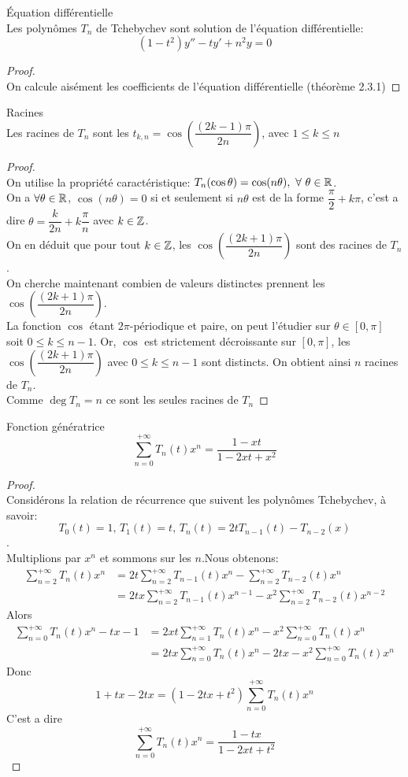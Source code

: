 \bprop
Équation différentielle
\\Les polynômes $ T_{n} $ de Tchebychev sont solution de l'équation différentielle:
$$(1-t^{2})y''-ty'+n^{2}y=0$$
\eprop
\begin{proof}
$ $\\
On calcule aisément les coefficients de l'équation différentielle (théorème 2.3.1)
\end{proof}

\bprop
Racines
\\Les racines de $T_n$ sont les $t_{k,n}=\cos \left(\dfrac{(2k-1)\pi}{2n}\right)$, avec $1\leqslant k \leqslant n$
\eprop
\begin{proof}
$ $\\On utilise la propriété caractéristique: $ T_{n}(\cos \theta)=\cos (n\theta),\ \forall \ \theta \in \R$.
\\On a $\forall \theta \in \mathbb R$, $\cos (n\theta)=0$ si et seulement si $n\theta$ est de la forme $\dfrac{\pi}{2}+k\pi$, c'est a dire $\theta = \dfrac{k}{2n}+k\dfrac{\pi}{n}$ avec $k\in \mathbb Z$.
\\On en déduit que pour tout $k\in \mathbb Z$, les $\cos \left(\dfrac{(2k+1)\pi}{2n}\right)$ sont des racines de $T_n$.
\\On cherche maintenant combien de valeurs distinctes prennent les $\cos \left(\dfrac{(2k+1)\pi}{2n}\right)$.
\\La fonction $\cos$ étant $2\pi$-périodique et paire, on peut l'étudier sur $\theta \in [0, \pi]$ soit $0\leqslant k \leqslant n-1$. Or, $\cos$ est strictement décroissante sur $[0, \pi]$, les $\cos \left(\dfrac{(2k+1)\pi}{2n}\right)$ avec $0\leqslant k \leqslant n-1$ sont distincts. On obtient ainsi $n$ racines de $T_n$.
\\Comme $\deg T_n = n$ ce sont les seules racines de $T_n$
\end{proof}

\bprop
Fonction génératrice
$$\sum\limits_{n=0}^{+\infty}T_n(t)x^n = \dfrac{1-xt}{1-2xt+x^2}$$
\eprop
\begin{proof}
$ $\\Considérons la relation de récurrence que suivent les polynômes Tchebychev, à savoir: $$T_0(t)=1\text{, } T_1(t)= t\text{, } T_n(t)=2tT_{n-1}(t)-T_{n-2}(x)$$.
\\Multiplions par $x^n$ et sommons sur les $n$.Nous obtenons:
\begin{align*}
\sum\limits_{n=2}^{+\infty}T_n(t)x^n &=2t\sum\limits_{n=2}^{+\infty}T_{n-1}(t)x^n - \sum\limits_{n=2}^{+\infty}T_{n-2}(t)x^n\\
&=2tx\sum\limits_{n=2}^{+\infty}T_{n-1}(t)x^{n-1} - x^2 \sum\limits_{n=2}^{+\infty}T_{n-2}(t)x^{n-2}
\end{align*}
Alors
\begin{align*}
\sum\limits_{n=0}^{+\infty}T_n(t)x^n - tx - 1 &=2xt\sum\limits_{n=1}^{+\infty}T_{n}(t)x^n - x^2 \sum\limits_{n=0}^{+\infty}T_{n}(t)x^n\\
&=2tx\sum\limits_{n=0}^{+\infty}T_{n}(t)x^{n} -2tx - x^2 \sum\limits_{n=0}^{+\infty}T_{n}(t)x^{n}
\end{align*}
Donc
$$1+tx-2tx=(1-2tx+t^2)\sum\limits_{n=0}^{+\infty}T_n(t)x^n$$
C'est a dire
$$\sum\limits_{n=0}^{+\infty}T_n(t)x^n=\dfrac{1-tx}{1-2xt+t^2}$$
\end{proof}